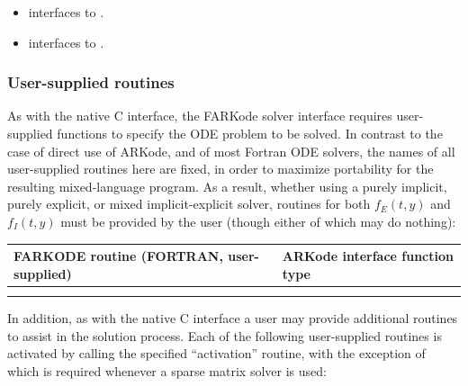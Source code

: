 \documentclass[letterpaper,10pt,english]{sphinxmanual}
\begin{document}
\begin{itemize}
\item {} 
{\hyperref[f_interface/Usage:f/_/FARKSPILSSETJAC]{}} interfaces to {\hyperref[c_interface/User_callable:ARKSpilsSetJacTimesVecFn]{}}.

\item {} 
{\hyperref[f_interface/Usage:f/_/FARKSPILSSETPREC]{}} interfaces to {\hyperref[c_interface/User_callable:ARKSpilsSetPreconditioner]{}}.

\end{itemize}


\subsubsection{User-supplied routines}
\label{f_interface/Routines:finterface-usersupplied}\label{f_interface/Routines:user-supplied-routines}
As with the native C interface, the FARKode solver interface requires
user-supplied functions to specify the ODE problem to be solved.  In
contrast to the case of direct use of ARKode, and of most Fortran ODE
solvers, the names of all user-supplied routines here are fixed, in
order to maximize portability for the resulting mixed-language program.
As a result, whether using a purely implicit, purely explicit, or
mixed implicit-explicit solver, routines for both $f_E(t,y)$ and
$f_I(t,y)$ must be provided by the user (though either of which
may do nothing):

\begin{tabulary}{\linewidth}{|L|L|}
\hline
\textbf{
FARKODE routine
(FORTRAN, user-supplied)
} & \textbf{
ARKode interface
function type
}\\\hline

{\hyperref[f_interface/Usage:f/_/FARKIFUN]{}}
 & 
{\hyperref[c_interface/User_supplied:ARKRhsFn]{}}
\\\hline

{\hyperref[f_interface/Usage:f/_/FARKEFUN]{}}
 & 
{\hyperref[c_interface/User_supplied:ARKRhsFn]{}}
\\\hline
\end{tabulary}


In addition, as with the native C interface a user may provide
additional routines to assist in the solution process.  Each of the
following user-supplied routines is activated by calling the specified
``activation'' routine, with the exception of {\hyperref[f_interface/Usage:f/_/FARKSPJAC]{}}
which is required whenever a sparse matrix solver is used:
\end{document}
